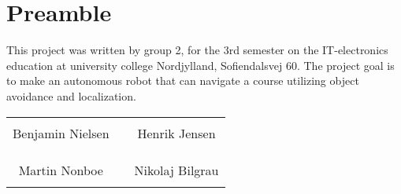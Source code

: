 \chapter*{Preamble}



This project was written by group 2, for the 3rd semester on the IT-electronics education at university college Nordjylland, Sofiendalsvej 60. The project goal is to make an autonomous robot that can navigate a course utilizing object avoidance and localization.
%
\phantom{Luft}\vspace{3cm}
\begin{table}[H]
	\centering
		\begin{tabular}{c c c}
			\underline{\phantom{JAERJAERJAERJAERGO}} & \phantom{cookies} & \underline{\phantom{JAERJAERJAERJAERGO}} \\
			Benjamin Nielsen			& \phantom{cookies} & Henrik Jensen		\\
			&&\\
			&&\\
			\underline{\phantom{JAERJAERJAERJAERGO}} & \phantom{cookies} & \underline{\phantom{JAERJAERJAERJAERGO}} \\
			Martin Nonboe			& \phantom{cookies} & Nikolaj Bilgrau		\\
			&&\\
						
		\end{tabular}
\end{table}
